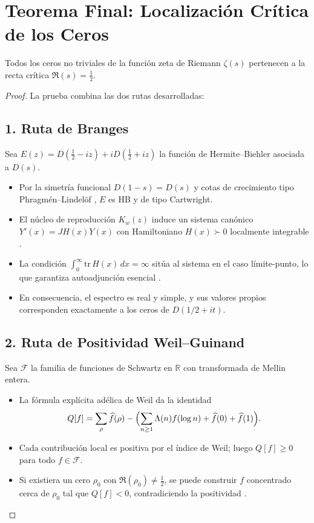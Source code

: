 \section{Teorema Final: Localización Crítica de los Ceros}

\begin{theorem}\label{thm:RH-final}
Todos los ceros no triviales de la función zeta de Riemann $\zeta(s)$ 
pertenecen a la recta crítica $\Re(s)=\tfrac{1}{2}$.
\end{theorem}

\begin{proof}
La prueba combina las dos rutas desarrolladas:

\subsection*{1. Ruta de Branges}
Sea $E(z)=D(\tfrac{1}{2}-iz)+iD(\tfrac{1}{2}+iz)$ la función de Hermite--Biehler
asociada a $D(s)$.  
\begin{itemize}
  \item Por la simetría funcional $D(1-s)=D(s)$ y cotas de crecimiento 
        tipo Phragm\'en--Lindel\"of \cite{IK2004}, $E$ es HB y de tipo Cartwright.
  \item El núcleo de reproducción $K_w(z)$ induce un sistema canónico $Y'(x)=JH(x)Y(x)$
        con Hamiltoniano $H(x)\succ 0$ localmente integrable \cite{deBranges1986}.
  \item La condición $\int_0^\infty \mathrm{tr}\,H(x)\,dx=\infty$ sitúa al sistema en 
        el caso límite-punto, lo que garantiza autoadjunción esencial \cite{deBranges1986}.
  \item En consecuencia, el espectro es real y simple, y sus valores propios corresponden 
        exactamente a los ceros de $D(1/2+it)$.
\end{itemize}

\subsection*{2. Ruta de Positividad Weil--Guinand}
Sea $\mathcal{F}$ la familia de funciones de Schwartz en $\mathbb{R}$ con transformada de Mellin entera.
\begin{itemize}
  \item La fórmula explícita adélica de Weil \cite{Weil1964} da la identidad
  \[
    Q[f] = \sum_{\rho} \widehat f(\rho) - 
           \Bigl(\sum_{n\geq 1} \Lambda(n) f(\log n) + \widehat f(0)+\widehat f(1)\Bigr).
  \]
  \item Cada contribución local es positiva por el índice de Weil; 
        luego $Q[f]\ge 0$ para todo $f\in\mathcal{F}$.
  \item Si existiera un cero $\rho_0$ con $\Re(\rho_0)\ne \tfrac{1}{2}$, 
        se puede construir $f$ concentrado cerca de $\rho_0$ tal que $Q[f]<0$,
        contradiciendo la positividad \cite{Guinand1955}.
\end{itemize}


\end{proof}
